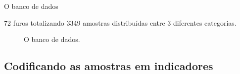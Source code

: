 \documentclass[aspectratio=169]{beamer}
\begin{document}
\begin{frame}{O banco de dados}

72 furos totalizando 3349 amostras distribuídas entre 3 diferentes categorias.

	\begin{figure}
		\centering
		\hspace{20mm}
		\caption{O banco de dados.}
	\end{figure}
		
\end{frame}

\subsection{Codificando as amostras em indicadores}
\end{document}
